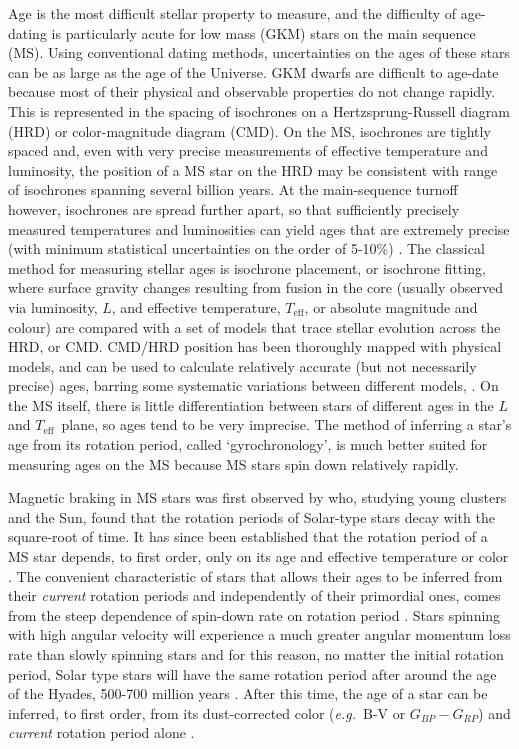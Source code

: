 \documentclass[useAMS, usenatbib, preprint, 12pt]{aastex}
\newcommand{\eg}{{\it e.g.}}
\newcommand{\teff}{$T_{\mathrm{eff}}$}
\newcommand{\gcolor}{$G_{BP} - G_{RP}$}
\begin{document}
Age is the most difficult stellar property to measure, and the difficulty of
age-dating is particularly acute for low mass (GKM) stars on the main sequence
(MS).
Using conventional dating methods, uncertainties on the ages of these stars
can be as large as the age of the Universe.
GKM dwarfs are difficult to age-date because most of their physical and
observable properties do not change rapidly.
This is represented in the spacing of isochrones on a Hertzsprung-Russell
diagram (HRD) or color-magnitude diagram (CMD).
On the MS, isochrones are tightly spaced and, even with very precise
measurements of effective temperature and luminosity, the position of a MS
star on the HRD may be consistent with range of isochrones spanning several
billion years.
At the main-sequence turnoff however, isochrones are spread further apart, so
that sufficiently precisely measured temperatures and luminosities can yield
ages that are extremely precise (with minimum statistical uncertainties on the
order of 5-10\%) \citep[\eg][]{pont2004}.
The classical method for measuring stellar ages is isochrone placement, or
isochrone fitting, where surface gravity changes resulting from fusion in the
core (usually observed via luminosity, $L$, and effective temperature, \teff,
or absolute magnitude and colour) are compared with a set of models that trace
stellar evolution across the HRD, or CMD.
CMD/HRD position has been thoroughly mapped with physical models, and can be
used to calculate relatively accurate (but not necessarily precise) ages,
barring some systematic variations between different models,
\citep[\eg][]{yi2001, dotter2008, dotter2016}.
On the MS itself, there is little differentiation between stars of different
ages in the $L$ and \teff\ plane, so ages tend to be very imprecise.
The method of inferring a star's age from its rotation period, called
`gyrochronology', is much better suited for measuring ages on the MS because
MS stars spin down relatively rapidly.

Magnetic braking in MS stars was first observed by \citet{skumanich1972} who,
studying young clusters and the Sun, found that the rotation periods of
Solar-type stars decay with the square-root of time.
It has since been established that the rotation period of a MS star depends,
to first order, only on its age and effective temperature or color
\citep[\eg][]{barnes2003}.
The convenient characteristic of stars that allows their ages to be inferred
from their {\it current} rotation periods and independently of their
primordial ones, comes from the steep dependence of spin-down rate on rotation
period \citep{kawaler1989}.
Stars spinning with high angular velocity will experience a much greater
angular momentum loss rate than slowly spinning stars and for this reason, no
matter the initial rotation period, Solar type stars will have the same
rotation period after around the age of the Hyades, 500-700 million years
\citep{irwin2009, gallet2015}.
After this time, the age of a star can be inferred, to first order, from its
dust-corrected color (\eg\ B-V or \gcolor) and {\it current} rotation period
alone \citep[See][for an analysis of how initial conditions effect gyrochronal
ages]{epstein2014}.
\end{document}
